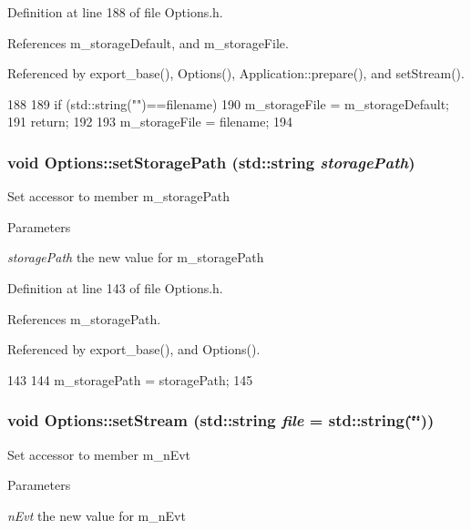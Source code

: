 Definition at line 188 of file Options.h.

References m\_\-storageDefault, and m\_\-storageFile.

Referenced by export\_\-base(), Options(), Application::prepare(), and setStream().


\begin{DoxyCode}
188                                                               {
189                 if (std::string("")==filename) {
190                         m_storageFile = m_storageDefault;
191                         return;
192                 }
193                 m_storageFile = filename;
194         }
\end{DoxyCode}
\hypertarget{classOptions_a8c32e222956c77ed2ec5387318f91394}{
\subsubsection[{setStoragePath}]{\setlength{\rightskip}{0pt plus 5cm}void Options::setStoragePath (std::string {\em storagePath})}}
\label{classOptions_a8c32e222956c77ed2ec5387318f91394}
Set accessor to member m\_\-storagePath 
\begin{DoxyParams}{Parameters}
\item[{\em storagePath}]the new value for m\_\-storagePath \end{DoxyParams}


Definition at line 143 of file Options.h.

References m\_\-storagePath.

Referenced by export\_\-base(), and Options().


\begin{DoxyCode}
143                                                     {
144                 m_storagePath = storagePath;
145         }
\end{DoxyCode}
\hypertarget{classOptions_af7df7a64e597f0bed79ca979f8144daa}{
\subsubsection[{setStream}]{\setlength{\rightskip}{0pt plus 5cm}void Options::setStream (std::string {\em file} = {\ttfamily std::string(\char`\"{}\char`\"{})})}}
\label{classOptions_af7df7a64e597f0bed79ca979f8144daa}
Set accessor to member m\_\-nEvt 
\begin{DoxyParams}{Parameters}
\item[{\em nEvt}]the new value for m\_\-nEvt \end{DoxyParams}


